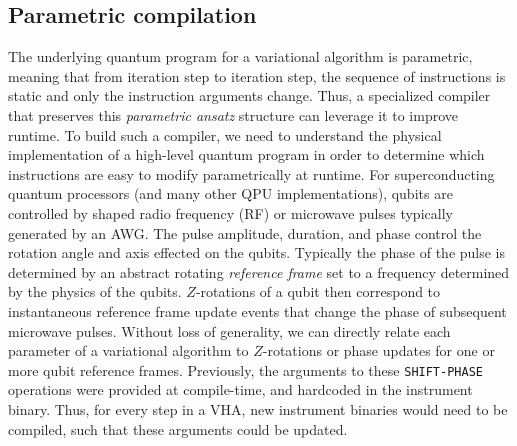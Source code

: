 \documentclass[12pt]{iopart}
\begin{document}
\subsection{Parametric compilation}

The underlying quantum program for a variational algorithm is parametric, meaning that from iteration step to iteration step, the sequence of instructions is static and only the instruction arguments change. Thus, a specialized compiler that preserves this \textit{parametric ansatz} structure can leverage it to improve runtime. To build such a compiler, we need to understand the physical implementation of a high-level quantum program in order to determine which instructions are easy to modify parametrically at runtime. For superconducting quantum processors (and many other QPU implementations), qubits are controlled by shaped radio frequency (RF) or microwave pulses typically generated by an AWG. The pulse amplitude, duration, and phase control the rotation angle and axis effected on the qubits. Typically the phase of the pulse is determined by an abstract rotating \textit{reference frame} set to a frequency determined by the physics of the qubits. $Z$-rotations of a qubit then correspond to instantaneous reference frame update events that change the phase of subsequent microwave pulses. Without loss of generality, we can directly relate each parameter of a variational algorithm to $Z$-rotations or phase updates for one or more qubit reference frames. Previously, the arguments to these \texttt{SHIFT-PHASE} \cite{QuilRepo} operations were provided at compile-time, and hardcoded in the instrument binary. Thus, for every step in a VHA, new instrument binaries would need to be compiled, such that these arguments could be updated.
\end{document}
